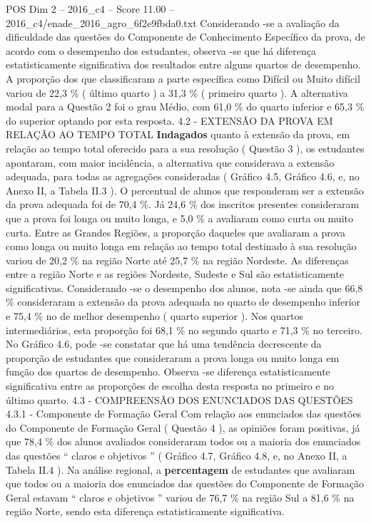 \begin{textsample}{POS Dim 2 – 2016\_c4 – Score 11.00 – 2016\_c4/enade\_2016\_agro\_6f2e9fbda0.txt}
Considerando -se a avaliação da dificuldade das questões do Componente de Conhecimento Específico da prova, de acordo com o desempenho dos estudantes, observa -se que há diferença estatisticamente significativa dos resultados entre alguns quartos de desempenho.
A proporção dos que classificaram a parte específica como Difícil ou Muito difícil variou de 22,3 \% ( último quarto ) a 31,3 \% ( primeiro quarto ).
A alternativa modal para a Questão 2 foi o grau Médio, com 61,0 \% do quarto inferior e 65,3 \% do superior optando por esta resposta. 4.2 - EXTENSÃO DA PROVA EM RELAÇÃO AO TEMPO TOTAL \textbf{Indagados} quanto à extensão da prova, em relação ao tempo total oferecido para a sua resolução ( Questão 3 ), os estudantes apontaram, com maior incidência, a alternativa que considerava a extensão adequada, para todas as agregações consideradas ( Gráfico 4.5, Gráfico 4.6, e, no Anexo II, a Tabela II.3 ).
O percentual de alunos que responderam ser a extensão da prova adequada foi de 70,4 \%.
Já 24,6 \% dos inscritos presentes consideraram que a prova foi longa ou muito longa, e 5,0 \% a avaliaram como curta ou muito curta.
Entre as Grandes Regiões, a proporção daqueles que avaliaram a prova como longa ou muito longa em relação ao tempo total destinado à sua resolução variou de 20,2 \% na região Norte até 25,7 \% na região Nordeste.
As diferenças entre a região Norte e as regiões Nordeste, Sudeste e Sul são estatisticamente significativas.
Considerando -se o desempenho dos alunos, nota -se ainda que 66,8 \% consideraram a extensão da prova adequada no quarto de desempenho inferior e 75,4 \% no de melhor desempenho ( quarto superior ).
Nos quartos intermediários, esta proporção foi 68,1 \% no segundo quarto e 71,3 \% no terceiro.
No Gráfico 4.6, pode -se constatar que há uma tendência decrescente da proporção de estudantes que consideraram a prova longa ou muito longa em função dos quartos de desempenho.
Observa -se diferença estatisticamente significativa entre as proporções de escolha desta resposta no primeiro e no último quarto. 4.3 - COMPREENSÃO DOS ENUNCIADOS DAS QUESTÕES 4.3.1 - Componente de Formação Geral Com relação aos enunciados das questões do Componente de Formação Geral ( Questão 4 ), as opiniões foram positivas, já que 78,4 \% dos alunos avaliados consideraram todos ou a maioria dos enunciados das questões “ claros e objetivos ” ( Gráfico 4.7, Gráfico 4.8, e, no Anexo II, a Tabela II.4 ).
Na análise regional, a \textbf{percentagem} de estudantes que avaliaram que todos ou a maioria dos enunciados das questões do Componente de Formação Geral estavam “ claros e objetivos ” variou de 76,7 \% na região Sul a 81,6 \% na região Norte, sendo esta diferença estatisticamente significativa.

\end{textsample}

